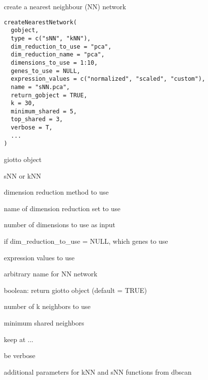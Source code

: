 \documentclass[a4paper]{book}
\begin{document}
%
\begin{Description}\relax
create a nearest neighbour (NN) network
\end{Description}
%
\begin{Usage}
\begin{verbatim}
createNearestNetwork(
  gobject,
  type = c("sNN", "kNN"),
  dim_reduction_to_use = "pca",
  dim_reduction_name = "pca",
  dimensions_to_use = 1:10,
  genes_to_use = NULL,
  expression_values = c("normalized", "scaled", "custom"),
  name = "sNN.pca",
  return_gobject = TRUE,
  k = 30,
  minimum_shared = 5,
  top_shared = 3,
  verbose = T,
  ...
)
\end{verbatim}
\end{Usage}
%
\begin{Arguments}
\begin{ldescription}
\item[\code{gobject}] giotto object

\item[\code{type}] sNN or kNN

\item[\code{dim\_reduction\_to\_use}] dimension reduction method to use

\item[\code{dim\_reduction\_name}] name of dimension reduction set to use

\item[\code{dimensions\_to\_use}] number of dimensions to use as input

\item[\code{genes\_to\_use}] if dim\_reduction\_to\_use = NULL, which genes to use

\item[\code{expression\_values}] expression values to use

\item[\code{name}] arbitrary name for NN network

\item[\code{return\_gobject}] boolean: return giotto object (default = TRUE)

\item[\code{k}] number of k neighbors to use

\item[\code{minimum\_shared}] minimum shared neighbors

\item[\code{top\_shared}] keep at ...

\item[\code{verbose}] be verbose

\item[\code{...}] additional parameters for kNN and sNN functions from dbscan
\end{ldescription}
\end{Arguments}
\end{document}
